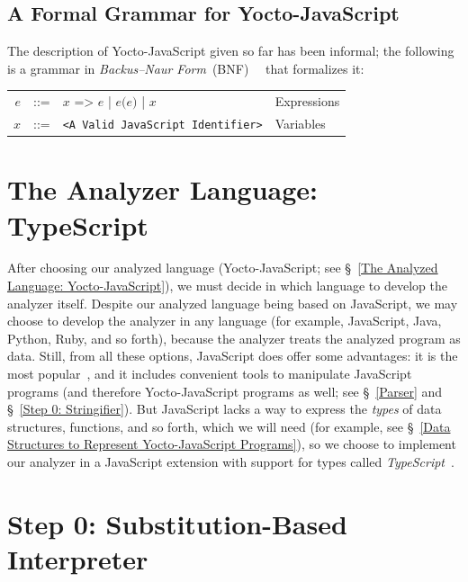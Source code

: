 \documentclass[12pt, oneside]{book}
\begin{document}
\begin{mdframed}[frametitle = {Advanced}]
\subsection{A Formal Grammar for Yocto-JavaScript}
\label{A Formal Grammar for Yocto-JavaScript}

The description of Yocto-JavaScript given so far has been informal; the following is a grammar in \emph{Backus–Naur Form}~(BNF)~\cite{bnf}~\cite[§~4.2]{dragon-book} that formalizes it:

\begin{center}
\begin{tabular}{rcll}
$e$ & ::= & $x\texttt{ => }e$ | $e\texttt{(}e\texttt{)}$ | $x$ & Expressions \\
$x$ & ::= & \texttt{<A Valid JavaScript Identifier>} & Variables \\
\end{tabular}
\end{center}

\end{mdframed}

\section{The Analyzer Language: TypeScript}
\label{The Analyzer Language: TypeScript}

After choosing our analyzed language (Yocto-JavaScript; see §~\ref{The Analyzed Language: Yocto-JavaScript}), we must decide in which language to develop the analyzer itself. Despite our analyzed language being based on JavaScript, we may choose to develop the analyzer in any language (for example, JavaScript, Java, Python, Ruby, and so forth), because the analyzer treats the analyzed program as data. Still, from all these options, JavaScript does offer some advantages: it is the most popular~\cite{stack-overflow-developer-survey, jet-brains-developer-survey}, and it includes convenient tools to manipulate JavaScript programs (and therefore Yocto-JavaScript programs as well; see §~\ref{Parser} and §~\ref{Step 0: Stringifier}). But JavaScript lacks a way to express the \emph{types} of data structures, functions, and so forth, which we will need (for example, see §~\ref{Data Structures to Represent Yocto-JavaScript Programs}), so we choose to implement our analyzer in a JavaScript extension with support for types called \emph{TypeScript}~\cite{typescript, typescript-deep-dive, understanding-typescript}.

\section{Step 0: Substitution-Based Interpreter}
\label{Step 0: Substitution-Based Interpreter}
\end{document}
